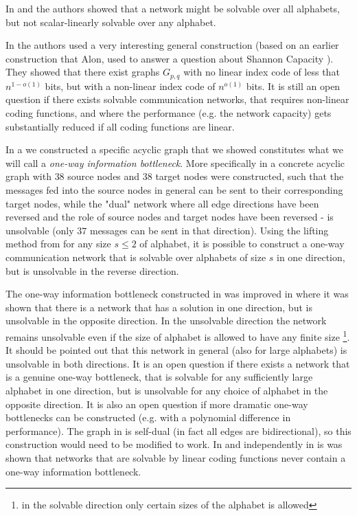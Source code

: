 \documentclass[12pt]{article}
\begin{document}
In \cite{Leh} and \cite{med} the authors showed that a network might be solvable over all alphabets, but not scalar-linearly solvable over any alphabet.

In \cite{Tel07} the authors used a very interesting general construction (based on an earlier construction that Alon, used to answer a question about Shannon Capacity \cite{Alon}). They showed that there exist  graphs $G_{p,q}$ with no linear index code of less that $n^{1-o(1)}$ bits, but with a non-linear index code of $n^{o(1)}$ bits. It is still an open question if there exists solvable communication networks, that requires non-linear coding functions, and where the performance (e.g. the network capacity) gets substantially reduced if all coding functions are linear. 

In \cite{Riis06} a we constructed a specific acyclic graph that we showed constitutes what we will call a {\it one-way information bottleneck}. More specifically in \cite{Riis06} a concrete acyclic graph with $38$ source nodes and $38$ target nodes were constructed, such that the messages fed into the source nodes in general can be sent to their corresponding target nodes, while the "dual" network where all edge directions have been reversed and the role of source nodes and target nodes have been reversed - is unsolvable (only $37$ messages can be sent in that direction). Using the lifting method from 
\cite{Riis04} for any size $s \leq 2$ of alphabet, it is possible to construct a one-way communication network that is solvable over alphabets of size $s$ in one direction, but is unsolvable in the reverse direction.

The one-way information bottleneck constructed in \cite{Riis06} was improved in \cite{DFZ06A} where it was shown  that there is a network that has a solution in one direction, but is unsolvable in the opposite direction. In the unsolvable direction the network remains unsolvable even if the size of alphabet is allowed to have any finite size \footnote{in the solvable direction only certain sizes of the alphabet is allowed}. It should be pointed out that this network in general (also for large alphabets) is unsolvable in both directions. It is an open question if there exists a network that is a genuine one-way bottleneck, that is solvable for any sufficiently large alphabet in one direction, but is unsolvable for any choice of alphabet in the opposite direction. It is also an open question if more dramatic  one-way bottlenecks can be constructed (e.g. with a polynomial difference in performance). The graph in 
\cite{Tel07} is self-dual (in fact all edges are bidirectional), so this construction would need to be modified to work.
In \cite{rev} and independently in \cite{Riis06} is was shown that networks that are solvable by linear coding functions  never contain a one-way information bottleneck. 
\end{document}
